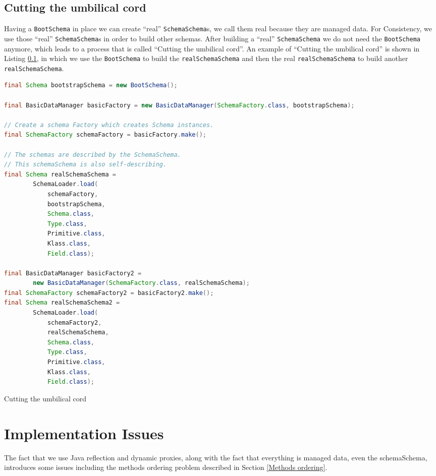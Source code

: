 \subsection{Cutting the umbilical cord}\label{subsec:Cutting the umbilical cord}
Having a \texttt{BootSchema} in place we can create ``real'' \texttt{SchemaSchema}s, we call them real because they are managed data.
For Consistency, we use those ``real'' \texttt{SchemaSchema}s in order to build other schemas.
After building a ``real'' \texttt{SchemaSchema} we do not need the \texttt{BootSchema} anymore, which leads to a process that is called ``Cutting the umbilical cord''.
An example of ``Cutting the umbilical cord'' is shown in Listing \ref{subsec:Cutting the umbilical cord}, in which we use the \texttt{BootSchema} to build the \texttt{realSchemaSchema} and then the real \texttt{realSchemaSchema} to build another \texttt{realSchemaSchema}.

\begin{sourcecode} [H]
	\begin{lstlisting}[language=Java, escapechar=|]
final Schema bootstrapSchema = new BootSchema();

final BasicDataManager basicFactory = new BasicDataManager(SchemaFactory.class, bootstrapSchema);

// Create a schema Factory which creates Schema instances.
final SchemaFactory schemaFactory = basicFactory.make();

// The schemas are described by the SchemaSchema.
// This schemaSchema is also self-describing.
final Schema realSchemaSchema =
        SchemaLoader.load(
        	schemaFactory, 
        	bootstrapSchema, 
        	Schema.class, 
        	Type.class, 
        	Primitive.class, 
        	Klass.class, 
        	Field.class);

final BasicDataManager basicFactory2 = 
		new BasicDataManager(SchemaFactory.class, realSchemaSchema);
final SchemaFactory schemaFactory2 = basicFactory2.make();
final Schema realSchemaSchema2 =
        SchemaLoader.load(
        	schemaFactory2, 
        	realSchemaSchema, 
        	Schema.class, 
        	Type.class, 
        	Primitive.class, 
        	Klass.class, 
        	Field.class);
	\end{lstlisting}
	\caption{Cutting the umbilical cord}
	\label{lst:Cutting the umbilical cord}
\end{sourcecode}

\section{Implementation Issues}\label{Implementation Issues}
The fact that we use Java reflection and dynamic proxies, along with the fact that everything is managed data, even the schemaSchema, introduces some issues including the methods ordering problem described in Section \ref{Methods ordering}.

